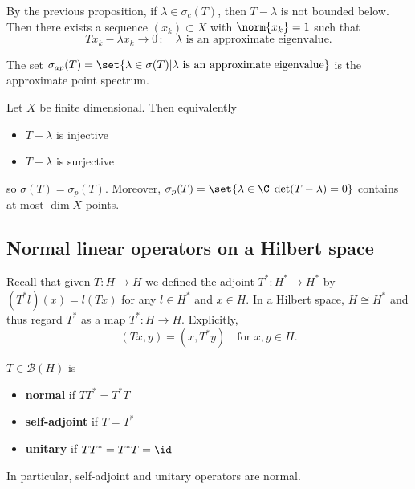 \documentclass{article}
\begin{document}
\begin{remark}
    By the previous proposition, if $\lambda \in \sigma_c(T)$, then $T-\lambda$ is not bounded below. Then there exists a sequence $(x_k) \subset X$ with $\norm{x_k}=1$ such that
    \begin{equation*}
        T x_k - \lambda x_k \to 0 \, : \quad \lambda \text{ is an approximate eigenvalue.}
    \end{equation*}

    The set $\sigma_{ap}(T) = \set{\lambda \in \sigma(T) | \lambda \text{ is an approximate eigenvalue}}$ is the approximate point spectrum.
\end{remark}

\begin{eg}
    Let $X$ be finite dimensional. Then equivalently
    \begin{itemize}
        \item $T - \lambda$ is injective
        \item $T - \lambda$ is surjective
    \end{itemize}
    so $\sigma(T) = \sigma_p(T)$. Moreover, $\sigma_p(T) = \set{\lambda \in \C | \det(T - \lambda) =0}$ contains at most $\dim X$ points.
\end{eg}

\subsection{Normal linear operators on a Hilbert space}
Recall that given $T: H \to H$ we defined the adjoint $T^* : H^* \to H^*$ by $(T^* l)(x) = l(T x)$ for any $l \in H^*$ and $x \in H$.
In a Hilbert space, $H \cong H^*$ and thus regard $T^*$ as a map $T^*: H \to H$. Explicitly,
\begin{equation*}
    (Tx, y) = (x, T^* y) \quad \text{for } x, y \in H.
\end{equation*}

\begin{defi}
    $T \in \mathcal{B}(H)$ is
    \begin{itemize}
        \item \textbf{normal} if $T T^* = T^* T$
        \item \textbf{self-adjoint} if $T = T^*$
        \item \textbf{unitary} if $T T^* = T^* T = \id$
    \end{itemize}
    In particular, self-adjoint and unitary operators are normal.
\end{defi}
\end{document}
